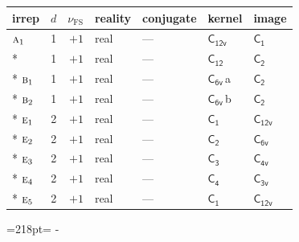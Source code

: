 \documentclass[10pt,a4paper]{article}
\newcommand{\needspace}[1]{\par\penalty-100\begingroup\dimen0=#1\relax\dimen2=\pagegoal
  \advance\dimen2-\pagetotal\ifdim\dimen0>\dimen2\relax\ifdim\dimen2>0pt\vfil\break\fi\fi
  \endgroup}
\numberwithin{equation}{section}
\newcommand{\grp}[1]{\mathsf{#1}}
\newcommand{\irr}[1]{\text{\normalfont\scshape #1}}
\newcommand{\detbox}[1]{{\setlength{\fboxsep}{1pt}\fbox{#1}}}
\newcommand{\clsletter}[1]{\,{\scriptsize\color{black!55}#1}}
\newcommand{\fsind}{\nu_{\mathrm{FS}}}
\begin{document}
{\small\renewcommand{\arraystretch}{1.25}\begin{longtable}{@{}lrrllll@{}}\toprule
irrep & $d$ & $\fsind$ & reality & conjugate & kernel & image\\\midrule\endhead
\bottomrule\endfoot\endlastfoot
$\irr{a}_{1}$ & 1 & $+1$ & real & --- & \href{C12v.pdf}{$\grp{C_{12v}}$} & \href{C1.pdf}{$\grp{C_{1}}$}\\*
\detbox{$\irr{a}_{2}$} & 1 & $+1$ & real & --- & \href{C12.pdf}{$\grp{C_{12}}$} & \href{C2.pdf}{$\grp{C_{2}}$}\\*
$\irr{b}_{1}$ & 1 & $+1$ & real & --- & \href{C6v.pdf}{$\grp{C_{6v}}$}\clsletter{a} & \href{C2.pdf}{$\grp{C_{2}}$}\\*
$\irr{b}_{2}$ & 1 & $+1$ & real & --- & \href{C6v.pdf}{$\grp{C_{6v}}$}\clsletter{b} & \href{C2.pdf}{$\grp{C_{2}}$}\\*
$\irr{e}_{1}$ & 2 & $+1$ & real & --- & \href{C1.pdf}{$\grp{C_{1}}$} & \href{C12v.pdf}{$\grp{C_{12v}}$}\\*
$\irr{e}_{2}$ & 2 & $+1$ & real & --- & \href{C2.pdf}{$\grp{C_{2}}$} & \href{C6v.pdf}{$\grp{C_{6v}}$}\\*
$\irr{e}_{3}$ & 2 & $+1$ & real & --- & \href{C3.pdf}{$\grp{C_{3}}$} & \href{C4v.pdf}{$\grp{C_{4v}}$}\\*
$\irr{e}_{4}$ & 2 & $+1$ & real & --- & \href{C4.pdf}{$\grp{C_{4}}$} & \href{C3v.pdf}{$\grp{C_{3v}}$}\\*
$\irr{e}_{5}$ & 2 & $+1$ & real & --- & \href{C1.pdf}{$\grp{C_{1}}$} & \href{C12v.pdf}{$\grp{C_{12v}}$}\\
\bottomrule\end{longtable}}
\needspace{218pt}
\end{document}
